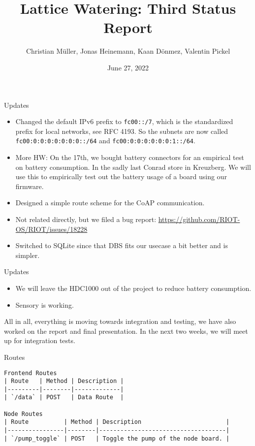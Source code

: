 \documentclass[10pt, xcolor=svgnames]{beamer}
\title{Lattice Watering: Third Status Report}
\author{Christian Müller, Jonas Heinemann, Kaan Dönmez, Valentin Pickel}
\institute{
    Software Project on Internet Communication

    Summer Term 2022
    
    Freie Universität Berlin

    Institute for Computer Science
}
\date{June 27, 2022}
\begin{document}
\maketitle

\begin{frame}{Updates}
    \begin{itemize}
        \item Changed the default IPv6 prefix to \texttt{fc00::/7}, which is the standardized prefix for local networks, see RFC 4193. So the subnets are now called \texttt{fc00:0:0:0:0:0:0:0::/64} and \texttt{fc00:0:0:0:0:0:0:1::/64}.
        \item More HW: On the 17th, we bought battery connectors for an empirical test on battery consumption. In the sadly last Conrad store in Kreuzberg. We will use this to empirically test out the battery usage of a board using our firmware.
        \item Designed a simple route scheme for the CoAP communication.
        \item Not related directly, but we filed a bug report: \url{https://github.com/RIOT-OS/RIOT/issues/18228}
        \item Switched to SQLite since that DBS fits our usecase a bit better and is simpler.
    \end{itemize}
\end{frame}

\begin{frame}{Updates}
    \begin{itemize}
        \item We will leave the HDC1000 out of the project to reduce battery consumption.
        \item Sensory is working.
    \end{itemize}

    All in all, everything is moving towards integration and testing, we have also worked on the report and final presentation. In the next two weeks, we will meet up for integration tests.
\end{frame}

\begin{frame}[fragile]{Routes}
    \small
    \begin{verbatim}
Frontend Routes
| Route   | Method | Description |
|---------|--------|-------------|
| `/data` | POST   | Data Route  |

Node Routes
| Route          | Method | Description                        |
|----------------|--------|------------------------------------|
| `/pump_toggle` | POST   | Toggle the pump of the node board. |
    \end{verbatim}
\end{frame}
\end{document}
